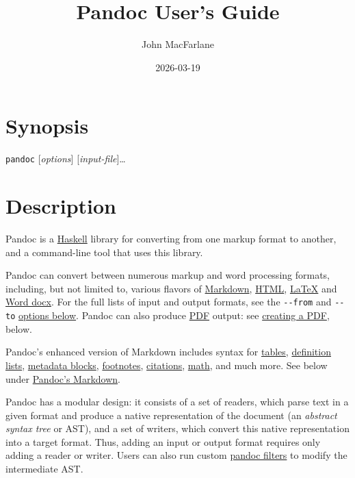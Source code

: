 \documentclass[
]{article}
\title{Pandoc User's Guide}
\author{John MacFarlane}
\date{2026-03-19}
\begin{document}
\maketitle

\hypertarget{synopsis}{%
\section{Synopsis}\label{synopsis}}

\texttt{pandoc} {[}\emph{options}{]} {[}\emph{input-file}{]}\ldots{}

\hypertarget{description}{%
\section{Description}\label{description}}

Pandoc is a \href{https://www.haskell.org}{Haskell} library for
converting from one markup format to another, and a command-line tool
that uses this library.

Pandoc can convert between numerous markup and word processing formats,
including, but not limited to, various flavors of
\href{https://daringfireball.net/projects/markdown/}{Markdown},
\href{https://www.w3.org/html/}{HTML},
\href{https://www.latex-project.org/}{LaTeX} and
\href{https://en.wikipedia.org/wiki/Office_Open_XML}{Word docx}. For the
full lists of input and output formats, see the \texttt{-\/-from} and
\texttt{-\/-to} \protect\hyperlink{general-options}{options below}.
Pandoc can also produce \href{https://www.adobe.com/pdf/}{PDF} output:
see \protect\hyperlink{creating-a-pdf}{creating a PDF}, below.

Pandoc's enhanced version of Markdown includes syntax for
\protect\hyperlink{tables}{tables},
\protect\hyperlink{definition-lists}{definition lists},
\protect\hyperlink{metadata-blocks}{metadata blocks},
\protect\hyperlink{footnotes}{footnotes},
\protect\hyperlink{citations}{citations},
\protect\hyperlink{math}{math}, and much more. See below under
\protect\hyperlink{pandocs-markdown}{Pandoc's Markdown}.

Pandoc has a modular design: it consists of a set of readers, which
parse text in a given format and produce a native representation of the
document (an \emph{abstract syntax tree} or AST), and a set of writers,
which convert this native representation into a target format. Thus,
adding an input or output format requires only adding a reader or
writer. Users can also run custom
\href{https://pandoc.org/filters.html}{pandoc filters} to modify the
intermediate AST.
\end{document}
